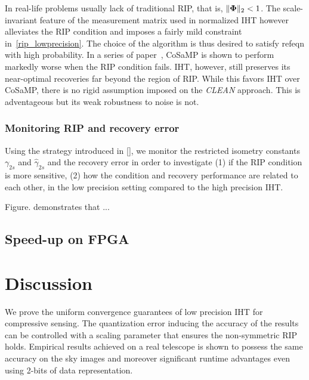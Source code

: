 \documentclass{article}
\begin{document}
In real-life problems usually lack of traditional RIP, that is, $\|{\bf \Phi}\|_2 < 1$. The scale-invariant feature of the measurement matrix used in normalized IHT however alleviates the RIP condition and imposes a fairly mild constraint in~\ref{rip_lowprecision}. The choice of the algorithm is thus desired to satisfy refeqn with high probability. In a series of paper~\cite{blumensath2010niht, blumensath2012greedy}, CoSaMP is shown to perform markedly worse when the RIP condition fails. IHT, however, still preserves its near-optimal recoveries far beyond the region of RIP. While this favors IHT over CoSaMP, there is no rigid assumption imposed on the {\it CLEAN} approach. This is adventageous but its weak robustness to noise is not.
 




\subsubsection{Monitoring RIP and recovery error}
Using the strategy introduced in [], we monitor the restricted isometry constants $\gamma_{2s}$ and $\hat{\gamma}_{2s}$ and the recovery error in order to investigate (1) if the RIP condition is more sensitive, (2) how the condition and recovery performance are related to each other, in the low precision setting compared to the high precision IHT.

Figure. demonstrates that ...
\subsection{Speed-up on FPGA}
\section{Discussion}\label{section_discussion}
We prove the uniform convergence guarantees of low precision IHT for compressive sensing. The quantization error inducing the accuracy of the results can be controlled with a scaling parameter that ensures the non-symmetric RIP holds. Empirical results achieved on a real telescope is shown to possess the same accuracy on the sky images and moreover significant runtime advantages even using 2-bits of data representation.


\end{document}
